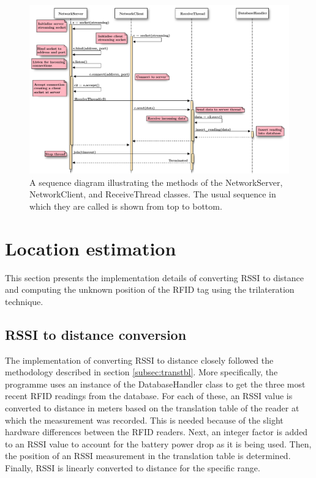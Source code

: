 \begin{figure}[h]
	\begin{center}
		\includegraphics[width=1\textwidth]{figures/seqdiag/network}
		\caption{A sequence diagram illustrating the methods of the \textsf{NetworkServer}, \textsf{NetworkClient}, and \textsf{ReceiveThread} classes. The usual sequence in which they are called is shown from top to bottom.}
		\label{fig:seqnet}
	\end{center}
\end{figure}

\section{Location estimation}
\label{sec:locest}

This section presents the implementation details of converting RSSI to distance and computing the unknown position of the RFID tag using the trilateration technique.

\subsection{RSSI to distance conversion}

The implementation of converting RSSI to distance closely followed the methodology described in section \ref{subsec:transtbl}. More specifically, the programme uses an instance of the \textsf{DatabaseHandler} class to get the three most recent RFID readings from the database. For each of these, an RSSI value is converted to distance in meters based on the translation table of the reader at which the measurement was recorded. This is needed because of the slight hardware differences between the RFID readers. Next, an integer factor is added to an RSSI value to account for the battery power drop as it is being used. Then, the position of an RSSI measurement in the translation table is determined. Finally, RSSI is linearly converted to distance for the specific range.

